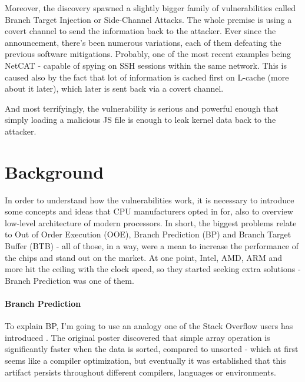 \documentclass{article}
\begin{document}
Moreover, the discovery spawned a slightly bigger family of vulnerabilities called Branch Target Injection or Side-Channel Attacks. The whole premise is using a covert channel to send the information back to the attacker. Ever since the announcement, there's been numerous variations, each of them defeating the previous software mitigations. Probably, one of the most recent examples being NetCAT - capable of spying on SSH sessions within the same network. This is caused also by the fact that lot of information is cached first on L-cache (more about it later), which later is sent back via a covert channel. 

And most terrifyingly, the vulnerability is serious and powerful enough that simply loading a malicious JS file is enough to leak kernel data back to the attacker.

\section{Background}

In order to understand how the vulnerabilities work, it is necessary to introduce some concepts and ideas that CPU manufacturers opted in for, also to overview low-level architecture of modern processors. In short, the biggest problems relate to Out of Order Execution (OOE), Branch Prediction (BP) and Branch Target Buffer (BTB) - all of those, in a way, were a mean to increase the performance of the chips and stand out on the market. At one point, Intel, AMD, ARM and more hit the ceiling with the clock speed, so they started seeking extra solutions - Branch Prediction was one of them. 

\paragraph{Branch Prediction}
To explain BP, I'm going to use an analogy one of the Stack Overflow users has introduced \cite{BranchpredictionSO}. The original poster discovered that simple array operation is significantly faster when the data is sorted, compared to unsorted - which at first seems like a compiler optimization, but eventually it was established that this artifact persists throughout different compilers, languages or environments. 
\end{document}
